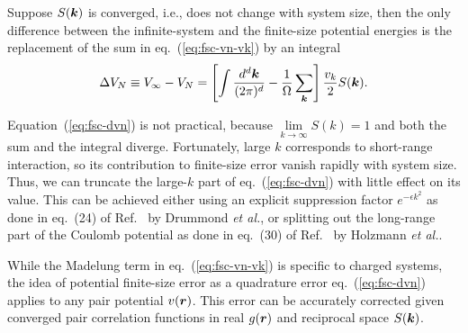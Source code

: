 Suppose $S(\boldsymbol{k})$ is converged, i.e., does not change with system size, then the only difference between the infinite-system and the finite-size potential energies is the replacement of the sum in eq.~(\ref{eq:fsc-vn-vk}) by an integral
\begin{align} \label{eq:fsc-dvn}
\Delta V_N \equiv V_{\infty} - V_N = \left[
\int \dfrac{d^d\boldsymbol{k}}{(2\pi)^d} - \dfrac{1}{\Omega}\sum\limits_{\boldsymbol{k}}
\right] \frac{v_k}{2} S(\boldsymbol{k}).
\end{align}

Equation~(\ref{eq:fsc-dvn}) is not practical, because $\lim\limits_{k\rightarrow\infty}S(k)=1$ and both the sum and the integral diverge. Fortunately, large $k$ corresponds to short-range interaction, so its contribution to finite-size error vanish rapidly with system size. Thus, we can truncate the large-$k$ part of eq.~(\ref{eq:fsc-dvn}) with little effect on its value. This can be achieved either using an explicit suppression factor $e^{-\epsilon k^2}$ as done in eq.~(24) of Ref.~\cite{Drummond2008} by Drummond \textit{et al.}, or splitting out the long-range part of the Coulomb potential as done in eq.~(30) of Ref.~\cite{Holzmann2016} by Holzmann \textit{et al.}.

While the Madelung term in eq.~(\ref{eq:fsc-vn-vk}) is specific to charged systems, the idea of potential finite-size error as a quadrature error eq.~(\ref{eq:fsc-dvn}) applies to any pair potential $v(\boldsymbol{r})$. This error can be accurately corrected given converged pair correlation functions in real $g(\boldsymbol{r})$ and reciprocal space $S(\boldsymbol{k})$.

